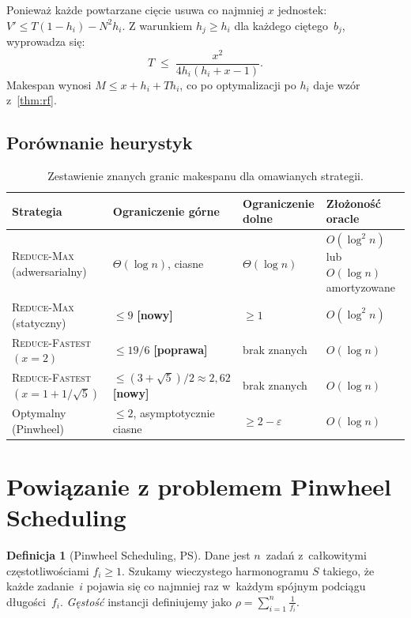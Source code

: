 \documentclass[12pt,a4paper]{article}
\theoremstyle{plain}
\theoremstyle{definition}
\newtheorem{definicja}[twierdzenie]{Definicja}
\theoremstyle{remark}
\newcommand{\RF}{\textsc{Reduce-Fastest}}
\newcommand{\RM}{\textsc{Reduce-Max}}
\begin{document}
Ponieważ każde powtarzane cięcie usuwa co najmniej $x$ jednostek:
$V' \leq T(1-h_i) - N^2 h_i$. Z warunkiem $h_j \geq h_i$ dla każdego
ciętego~$b_j$, wyprowadza się:
\[
  T \;\leq\; \frac{x^2}{4 h_i (h_i + x - 1)}.
\]
Makespan wynosi $M \leq x + h_i + T h_i$, co po optymalizacji po $h_i$
daje wzór z~\cref{thm:rf}.

\subsection{Porównanie heurystyk}

\begin{table}[htbp]
\centering
\caption{Zestawienie znanych granic makespanu dla omawianych strategii.}
\label{tab:comparison}
\small
\begin{tabularx}{\textwidth}{@{}lYYY@{}}
\toprule
\textbf{Strategia} & \textbf{Ograniczenie górne} & \textbf{Ograniczenie dolne}
  & \textbf{Złożoność oracle} \\
\midrule
\RM{} (adwersarialny) & $\Theta(\log n)$, ciasne & $\Theta(\log n)$
  & $O(\log^2 n)$ lub $O(\log n)$ amortyzowane \\
\RM{} (statyczny)     & $\leq 9$ \textbf{[nowy]} & $\geq 1$
  & $O(\log^2 n)$ \\
\RF$(x=2)$            & $\leq 19/6$ \textbf{[poprawa]} & brak znanych
  & $O(\log n)$ \\
\RF$(x=1+1/\sqrt{5})$ & $\leq (3+\sqrt{5})/2 \approx 2{,}62$ \textbf{[nowy]}
  & brak znanych & $O(\log n)$ \\
Optymalny (Pinwheel) & $\leq 2$, asymptotycznie ciasne & $\geq 2-\varepsilon$
  & $O(\log n)$ \\
\bottomrule
\end{tabularx}
\end{table}

\section{Powiązanie z problemem Pinwheel Scheduling}\label{sec:pinwheel}

\begin{definicja}[Pinwheel Scheduling, PS]
Dane jest $n$~zadań z~całkowitymi częstotliwościami $f_i \geq 1$.
Szukamy wieczystego harmonogramu $S$ takiego, że każde zadanie~$i$
pojawia się co najmniej raz w~każdym spójnym podciągu długości~$f_i$.
\emph{Gęstość} instancji definiujemy jako $\rho = \sum_{i=1}^{n} \tfrac{1}{f_i}$.
\end{definicja}
\end{document}
